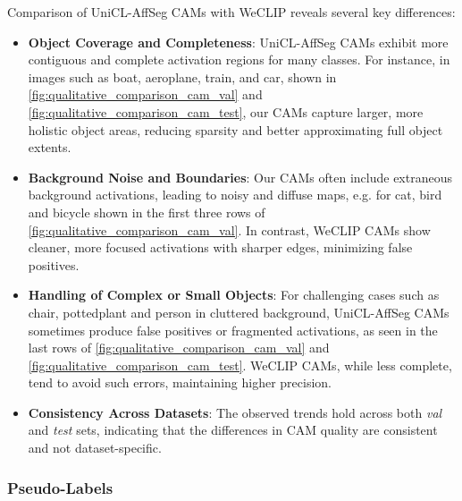 Comparison of UniCL-AffSeg CAMs with WeCLIP reveals several key differences:
\begin{itemize}
    \item \textbf{Object Coverage and Completeness}: UniCL-AffSeg CAMs exhibit more contiguous and complete activation regions for many classes. For instance, in images such as boat, aeroplane, train, and car, shown in \autoref{fig:qualitative_comparison_cam_val} and \autoref{fig:qualitative_comparison_cam_test}, our CAMs capture larger, more holistic object areas, reducing sparsity and better approximating full object extents.
    \item \textbf{Background Noise and Boundaries}: Our CAMs often include extraneous background activations, leading to noisy and diffuse maps, e.g. for cat, bird and bicycle shown in the first three rows of \autoref{fig:qualitative_comparison_cam_val}. In contrast, WeCLIP CAMs show cleaner, more focused activations with sharper edges, minimizing false positives. 
    \item \textbf{Handling of Complex or Small Objects}: For challenging cases such as chair, pottedplant and person in cluttered background, UniCL-AffSeg CAMs sometimes produce false positives or fragmented activations, as seen in the last rows of \autoref{fig:qualitative_comparison_cam_val} and \autoref{fig:qualitative_comparison_cam_test}. WeCLIP CAMs, while less complete, tend to avoid such errors, maintaining higher precision. 
    \item \textbf{Consistency Across Datasets}: The observed trends hold across both \textit{val} and \textit{test} sets, indicating that the differences in CAM quality are consistent and not dataset-specific.
\end{itemize}

\subsubsection{Pseudo-Labels}

